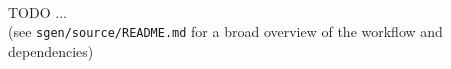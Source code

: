 \\TODO ...\\
(see \texttt{sgen/source/README.md} for a broad overview of the workflow and dependencies)




